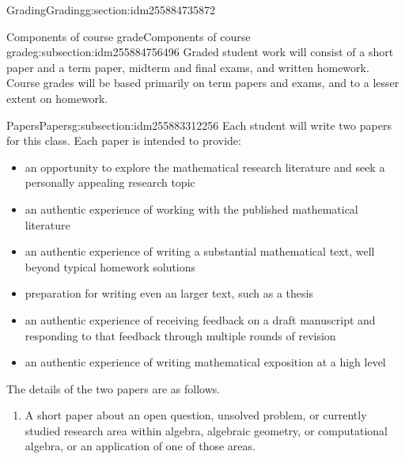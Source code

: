 \documentclass[oneside,10pt,]{article}
\begin{document}
%
%
\typeout{************************************************}
\typeout{************************************************}
%
\begin{sectionptx}{Grading}{}{Grading}{}{}{g:section:idm255884735872}
%
%
\typeout{************************************************}
\typeout{************************************************}
%
\begin{subsectionptx}{Components of course grade}{}{Components of course grade}{}{}{g:subsection:idm255884756496}
Graded student work will consist of a short paper and a term paper, midterm and final exams, and written homework. Course grades will be based primarily on term papers and exams, and to a lesser extent on homework.%
\end{subsectionptx}
%
%
\typeout{************************************************}
\typeout{************************************************}
%
\begin{subsectionptx}{Papers}{}{Papers}{}{}{g:subsection:idm255883312256}
Each student will write two papers for this class. Each paper is intended to provide:%
\begin{itemize}[label=\textbullet]
\item{}an opportunity to explore the mathematical research literature and seek a personally appealing research topic%
\item{}an authentic experience of working with the published mathematical literature%
\item{}an authentic experience of writing a substantial mathematical text, well beyond typical homework solutions%
\item{}preparation for writing even an larger text, such as a thesis%
\item{}an authentic experience of receiving feedback on a draft manuscript and responding to that feedback through multiple rounds of revision%
\item{}an authentic experience of writing mathematical exposition at a high level%
\end{itemize}
%
\par
The details of the two papers are as follows.%
\begin{enumerate}
\item{}A short paper about an open question, unsolved problem, or currently studied research area within algebra, algebraic geometry, or computational algebra, or an application of one of those areas.%

\end{enumerate}
\end{subsectionptx}
\end{sectionptx}
\end{document}
